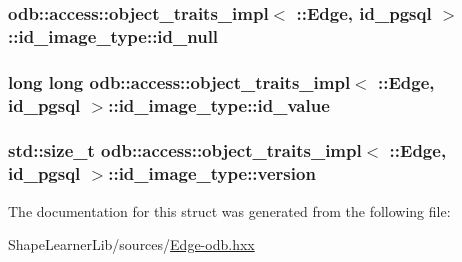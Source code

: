 \subsubsection[{id\+\_\+null}]{ odb\+::access\+::object\+\_\+traits\+\_\+impl$<$ \+::{\bf Edge}, id\+\_\+pgsql $>$\+::id\+\_\+image\+\_\+type\+::id\+\_\+null}\label{structodb_1_1access_1_1object__traits__impl_3_01_1_1_edge_00_01id__pgsql_01_4_1_1id__image__type_a73c0975227921eb1c048179e79a1cae7}
\hypertarget{structodb_1_1access_1_1object__traits__impl_3_01_1_1_edge_00_01id__pgsql_01_4_1_1id__image__type_a9774107a1509c50c04542cd47c0ad857}{}
\subsubsection[{id\+\_\+value}]{\setlength{\rightskip}{0pt plus 5cm}long long odb\+::access\+::object\+\_\+traits\+\_\+impl$<$ \+::{\bf Edge}, id\+\_\+pgsql $>$\+::id\+\_\+image\+\_\+type\+::id\+\_\+value}\label{structodb_1_1access_1_1object__traits__impl_3_01_1_1_edge_00_01id__pgsql_01_4_1_1id__image__type_a9774107a1509c50c04542cd47c0ad857}
\hypertarget{structodb_1_1access_1_1object__traits__impl_3_01_1_1_edge_00_01id__pgsql_01_4_1_1id__image__type_a51b03036a168890325b701847c17dab3}{}
\subsubsection[{version}]{\setlength{\rightskip}{0pt plus 5cm}std\+::size\+\_\+t odb\+::access\+::object\+\_\+traits\+\_\+impl$<$ \+::{\bf Edge}, id\+\_\+pgsql $>$\+::id\+\_\+image\+\_\+type\+::version}\label{structodb_1_1access_1_1object__traits__impl_3_01_1_1_edge_00_01id__pgsql_01_4_1_1id__image__type_a51b03036a168890325b701847c17dab3}


The documentation for this struct was generated from the following file\+:\begin{DoxyCompactItemize}
\item 
Shape\+Learner\+Lib/sources/\hyperlink{_edge-odb_8hxx}{Edge-\/odb.\+hxx}\end{DoxyCompactItemize}
